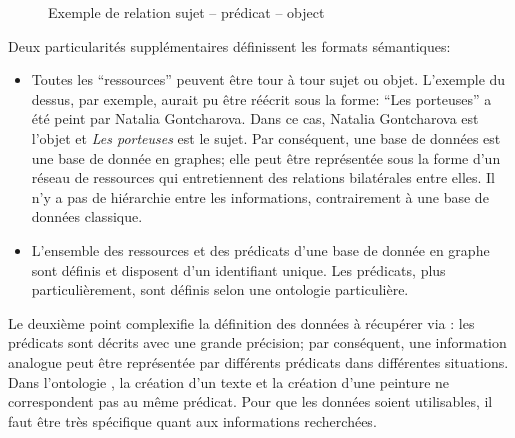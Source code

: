 \begin{figure}[!h]
	\centering
	\caption{Exemple de relation sujet -- prédicat -- object}
	\label{fig:triplet}
\end{figure}

Deux particularités supplémentaires définissent les formats sémantiques:
\begin{itemize}
	\item Toutes les \enquote{ressources} peuvent être tour à tour sujet ou objet. L'exemple du dessus, par exemple, aurait pu être réécrit sous la forme: \enquote{Les porteuses} a été peint par Natalia Gontcharova. Dans ce cas, Natalia Gontcharova est l'objet et \textit{Les porteuses} est le sujet. Par conséquent, une base de données \rdf{} est une base de donnée en graphes; elle peut être représentée sous la forme d'un réseau de ressources qui entretiennent des relations bilatérales entre elles. Il n'y a pas de hiérarchie entre les informations, contrairement à une base de données \xml{} classique.
	\item L'ensemble des ressources et des prédicats d'une base de donnée en graphe sont définis et disposent d'un identifiant unique. Les prédicats, plus particulièrement, sont définis selon une ontologie particulière.
\end{itemize}

Le deuxième point complexifie la définition des données à récupérer via \sparql{}: les prédicats sont décrits avec une grande précision; par conséquent, une information analogue peut être représentée par différents prédicats dans différentes situations. Dans l'ontologie \wkd{}, la création d'un texte et la création d'une peinture ne correspondent pas au même prédicat. Pour que les données soient utilisables, il faut être très spécifique quant aux informations recherchées. 

